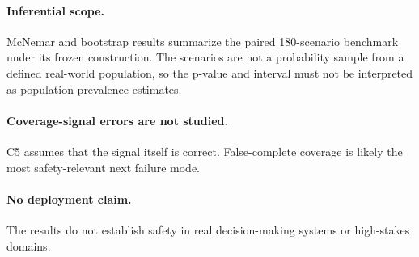 \paragraph{Inferential scope.}
McNemar and bootstrap results summarize the paired 180-scenario benchmark under its frozen
construction. The scenarios are not a probability sample from a defined real-world
population, so the p-value and interval must not be interpreted as population-prevalence
estimates.

\paragraph{Coverage-signal errors are not studied.}
C5 assumes that the signal itself is correct. False-complete coverage is likely the most
safety-relevant next failure mode.

\paragraph{No deployment claim.}
The results do not establish safety in real decision-making systems or high-stakes domains.
